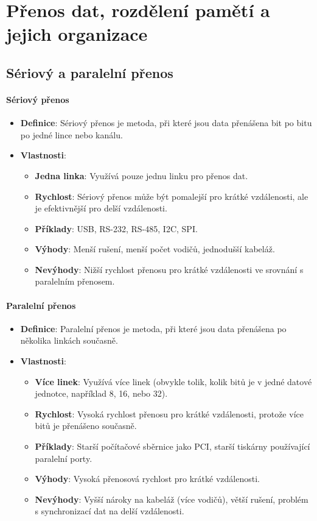 \section{Přenos dat, rozdělení pamětí a jejich organizace}
\subsection{Sériový a paralelní přenos}
\paragraph{Sériový přenos}
\begin{itemize}
    \item \textbf{Definice}: Sériový přenos je metoda, při které jsou data přenášena bit po bitu po jedné lince nebo kanálu.
    \item \textbf{Vlastnosti}:
    \begin{itemize}
        \item \textbf{Jedna linka}: Využívá pouze jednu linku pro přenos dat.
        \item \textbf{Rychlost}: Sériový přenos může být pomalejší pro krátké vzdálenosti, ale je efektivnější pro delší vzdálenosti.
        \item \textbf{Příklady}: USB, RS-232, RS-485, I2C, SPI.
        \item \textbf{Výhody}: Menší rušení, menší počet vodičů, jednodušší kabeláž.
        \item \textbf{Nevýhody}: Nižší rychlost přenosu pro krátké vzdálenosti ve srovnání s paralelním přenosem.
    \end{itemize}
\end{itemize}

\paragraph{Paralelní přenos}
\begin{itemize}
    \item \textbf{Definice}: Paralelní přenos je metoda, při které jsou data přenášena po několika linkách současně.
    \item \textbf{Vlastnosti}:
    \begin{itemize}
        \item \textbf{Více linek}: Využívá více linek (obvykle tolik, kolik bitů je v jedné datové jednotce, například 8, 16, nebo 32).
        \item \textbf{Rychlost}: Vysoká rychlost přenosu pro krátké vzdálenosti, protože více bitů je přenášeno současně.
        \item \textbf{Příklady}: Starší počítačové sběrnice jako PCI, starší tiskárny používající paralelní porty.
        \item \textbf{Výhody}: Vysoká přenosová rychlost pro krátké vzdálenosti.
        \item \textbf{Nevýhody}: Vyšší nároky na kabeláž (více vodičů), větší rušení, problém s synchronizací dat na delší vzdálenosti.
    \end{itemize}
\end{itemize}

